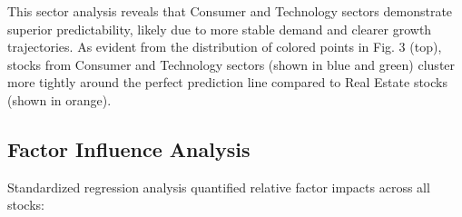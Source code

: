 \documentclass[3p,times,procedia]{elsarticle}
\begin{document}
This sector analysis reveals that Consumer and Technology sectors demonstrate superior predictability, likely due to more stable demand and clearer growth trajectories.
As evident from the distribution of colored points in Fig. 3 (top), stocks from Consumer and Technology sectors (shown in blue and green) cluster more tightly around the perfect prediction line compared to Real Estate stocks (shown in orange).


\begin{table}[!ht]
\centering
\caption{\textbf{Market Capitalization Impact on Prediction Accuracy}}
\end{table}


\FloatBarrier
\subsection{Factor Influence Analysis}
Standardized regression analysis quantified relative factor impacts across all stocks:
\end{document}
